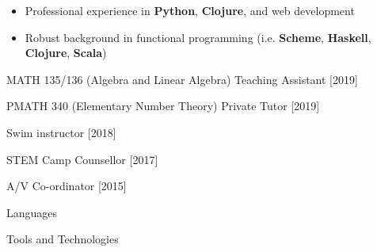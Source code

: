 
\begin{itemize}
    \item Professional experience in \textbf{Python}, \textbf{Clojure}, and web 
        development
    \item Robust background in functional programming (i.e. \textbf{Scheme}, 
        \textbf{Haskell}, \textbf{Clojure}, \textbf{Scala})
\end{itemize}

\smallskip

\renewcommand{\labelitemi}{$\textperiodcentered$}
\vspace{\topsep} %
\begin{tightitemize}
    \item MATH 135/136 (Algebra and Linear Algebra) Teaching Assistant [2019]
    \item PMATH 340 (Elementary Number Theory) Private Tutor [2019]
    \item Swim instructor [2018]
    \item STEM Camp Counsellor [2017]
    \item A/V Co-ordinator [2015]
\end{tightitemize}

\smallskip


Languages

\smallskip


\divider

Tools and Technologies

\smallskip


\smallskip



